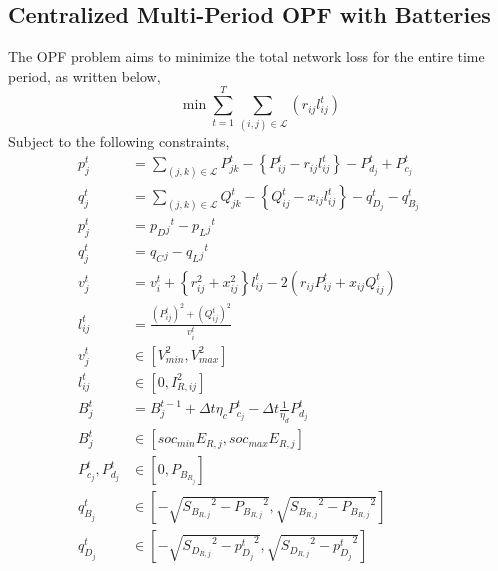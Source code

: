 \documentclass{article}
\begin{document}
\subsection{Centralized Multi-Period OPF with Batteries}
The OPF problem aims to minimize the total network loss for the entire time period, as written below,
\begin{equation}
    \min {\sum_{t = 1}^{T} \sum_{(i, j) \in \mathcal{L}} (r_{ij}l_{ij}^t)}
\end{equation}
Subject to the following constraints,
\begin{align}
    {p_j^t} & = {\sum_{(j, k) \in \mathcal{L}} P_{jk}^t - \left\{P_{ij}^t - r_{ij}l_{ij}^t\right\} - P_{d_j}^t + P_{c_j}^t} && \label{eq:Pij} \\ 
    {q_j^t} & = {\sum_{(j, k) \in \mathcal{L}} Q_{jk}^t - \left\{Q_{ij}^t - x_{ij}l_{ij}^t\right\} - q_{D_j}^t - q_{B_j}^t} && \label{eq:Qij} \\ 
    {p_j^t} &= {p_D{_j}^t - p_L{_j}^t} \label{eq:pj}\\
    {q_j^t} &= {q_C{_j} -q_L{_j}^t} \label{eq:qj}\\
    {v_j^t} & = {v_{i}^t +  \left\{r_{ij}^2 + x_{ij}^2\right\}l_{ij}^t - 2(r_{ij}P_{ij}^t + x_{ij}Q_{ij}^t)} \label{eq:vj} && \\
    {l_{ij}^t} & = {\frac{(P_{ij}^{t})^2 + (Q_{ij}^{t})^2}{v_i^t}} \label{eq:lij} && \\
    { v^{t}_{j} } &\in { \left[ V^{2}_{min}, V^{2}_{max} \right]} \label{eq:lim_vj} && \\
    { l^{t}_{ij} } &\in { \left[ 0, I^{2}_{R, ij}
    \right] } \label{eq:lim_lij} && \\
    { B_{j}^{t} } &= {  B_{j}^{t-1} + \Delta t  \eta_c P_{c_j}^t - \Delta t\frac{1}{\eta_d} P_{d_j}^t } \label{eq:Bj} &&  \\
    { B^{t}_{j} } &\in { \left[ soc_{min}E_{R, j}, soc_{max}E_{R, j} \right] } \label{eq:lim_Bj} && \\
    { P^{t}_{c_{j}}, P^{t}_{d_{j}} }
    &\in
    { \left[ 0, P_{B_{R_{j}}} \right]} \label{eq:lim_PcPdj} && \\
    { q^{t}_{B_{j}} } 
    &\in 
    { \left[-\sqrt{ {S_{B_{R, j}}}^2 - {P_{B_{R, j}}}^2}, \sqrt{ {S_{B_{R, j}}}^2 - {P_{B_{R, j}}}^2}\right] } \label{eq:qBj} && \\
    { q^{t}_{D_{j}} } 
    &\in
    { \left[-\sqrt{ {S_{D_{R, j}}}^2 - {p^{t}_{D_{j}}}^2}, \sqrt{ {S_{D_{R, j}}}^2 - {p^{t}_{D_{j}}}^2}\right] } \label{eq:qDj} &&
\end{align}
\end{document}
